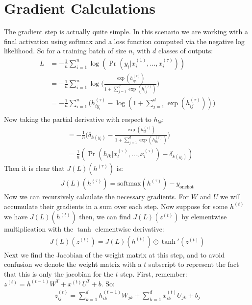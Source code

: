 \documentclass[12pt]{article}
\begin{document}
\section{Gradient Calculations}
The gradient step is actually quite simple. In this scenario we are working with a final activation using softmax and a loss function computed via the
negative log likelihood. So for a training batch of size $n$, with $d$ classes of outputs:
\begin{align*}
    L &= -\frac{1}{n} \sum_{i = 1}^n \log(\Pr(y_i | x_i^{(1)}, \dots, x_i^{(\tau)})) \\
    &= -\frac{1}{n} \sum_{i = 1}^n \log\Big(\frac{\exp(h^{(\tau)}_{iy_i})}{1 + \displaystyle \sum_{j = 1}^{d}\exp(h^{(\tau)}_{ij})}\Big) \\
    &= -\frac{1}{n} \sum_{i = 1}^n \Big(h^{(\tau)}_{iy_i} - \log(1 + \displaystyle \sum_{j = 1}^{d}\exp(h^{(\tau)}_{ij}))\Big) \\
\end{align*}
Now taking the partial derivative with respect to $h_{lk}$:
\begin{align*}
    &= -\frac{1}{n}\Big(\delta_{k(y_l)} -\frac{\exp(h^{(\tau)}_{lk})}{1 + \displaystyle \sum_{j = 1}^{d}\exp(h^{(\tau)}_{lk})}\Big) \\
    &= \frac{1}{n}(\Pr(h_{lk} | x^{(\tau)}_l, \dots, x^{(\tau)}_l) - \delta_{k(y_l)})
\end{align*}
Then it is clear that $J(L)(h^{(\tau)})$ is:
\begin{align*}
    J(L)(h^{(\tau)}) = \text{softmax}(h^{(\tau)}) - y_{\text{onehot}}
\end{align*}
Now we can recursively calculate the necessary gradients. For $W$ and $U$ we will accumulate their gradients in a sum over each step. Now suppose
for some $h^{(t)}$ we have $J(L)(h^{(t)})$ then, we can find $J(L)(z^{(t)})$ by elementwise multiplication with the $\tanh$ elementwise derivative:
\begin{align*}
    J(L)(z^{(t)}) = J(L)(h^{(t)}) \odot \tanh'(z^{(t)})
\end{align*}
Next we find the Jacobian of the weight matrix at this step, and to avoid confusion we denote the weight matrix with a $t$ subscript to represent the fact
that this is only the jacobian for the $t$ step. First, remember: $z^{(t)} = h^{(t-1)}W^T + x^{(t)}U^T + b$. So:
\begin{align*}
    z^{(t)}_{ij} = \displaystyle \sum_{k = 1}^{d}h^{(t-1)}_{ik}W_{jk} + \displaystyle \sum_{k = 1}^{d}x^{(t)}_{ik}U_{jk} + b_j
\end{align*}
\end{document}
